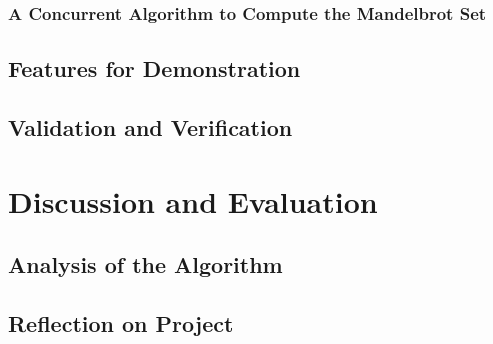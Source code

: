 \subsection{A Concurrent Algorithm to Compute the Mandelbrot Set}

\section{Features for Demonstration}

\section{Validation and Verification}

\chapter{Discussion and Evaluation}
\section{Analysis of the Algorithm}

\section{Reflection on Project}

